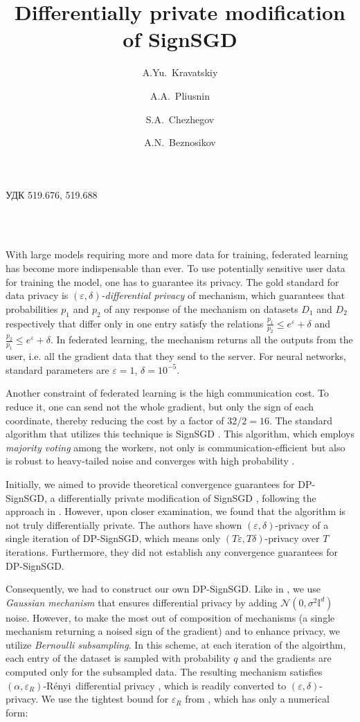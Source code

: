 \documentclass[a4paper, 12pt]{article}
\title{\textbf{Differentially private modification of SignSGD}}
\author[]{A.Yu.~Kravatskiy}
\author[]{A.A.~Pliusnin}
\author[]{S.A.~Chezhegov}
\author[]{A.N.~Beznosikov}
\affil[]{Moscow Institute of Physics and Technology}
\date{} %
\makeatletter
\renewcommand\maketitle{\par
  \begingroup
    \renewcommand\thefootnote{\@fnsymbol\c@footnote}%
    \def\@makefnmark{\rlap{\@textsuperscript{\normalfont\@thefnmark}}}%
    \long\def\@makefntext##1{\parindent 1em\noindent
            \hb@xt@1.8em{%
                \hss\@textsuperscript{\normalfont\@thefnmark}}##1}%
    \if@twocolumn
      \ifnum \col@number=\@ne
        \@maketitle
      \else
        \twocolumn[\@maketitle]%
      \fi
    \else
      \newpage
      \global\@topnum\z@
      \@maketitle
    \fi
    \thispagestyle{empty}\@thanks
  \endgroup
  \setcounter{footnote}{0}%
  \global\let\thanks\relax
  \global\let\maketitle\relax
  \global\let\@maketitle\relax
  \global\let\@thanks\@empty
  \global\let\@author\@empty
  \global\let\@date\@empty
  \global\let\@title\@empty
  \global\let\title\relax
  \global\let\author\relax
  \global\let\date\relax
  \global\let\and\relax
}
\renewcommand{\maketitle}{
  \begin{center}
    \fontsize{15}{12}\selectfont
    \textbf{\@title} \\
    \vspace{0.5em}
    \@author \\
    \vspace{0.5em}
    \@date
  \end{center}
  \vspace{-0.5em}
}
\renewcommand{\and}{\\} %
\newcommand{\eps}{\varepsilon}
\newcommand{\renyi}{R\'enyi}
\makeatother
\begin{document}
\noindent\foreignlanguage{russian}{УДК 519.676, 519.688}\vspace{-0.5em}
\maketitle
With large models requiring more and more data for training, federated learning has become more indispensable than ever. To use potentially sensitive user data for training the model, one has to guarantee its privacy. The gold standard for data privacy is \emph{$(\eps, \delta)$-differential privacy} \cite{Dwork2014} of mechanism, which guarantees that probabilities $p_1$ and $p_2$ of any response of the mechanism on datasets $D_1$ and $D_2$ respectively that differ only in one entry satisfy the relations $\frac{p_1}{p_2} \leq e^{\eps} + \delta$ and $\frac{p_2}{p_1} \leq e^{\eps} + \delta$. In federated learning, the mechanism returns all the outputs from the user, i.e. all the gradient data that they send to the server. For neural networks, standard parameters are $\eps = 1$, $\delta = 10^{-5}$. 

Another constraint of federated learning is the high communication cost. To reduce it, one can send not the whole gradient, but only the sign of each coordinate, thereby reducing the cost by a factor of $32/2 = 16$. The standard algorithm that utilizes this technique is SignSGD \cite{Bernstein2018}. This algorithm, which employs \emph{majority voting} among the workers, not only is communication-efficient but also is robust to heavy-tailed noise and converges with high probability \cite{Kornilov2025}.

Initially, we aimed to provide theoretical convergence guarantees for DP-SignSGD, a differentially private modification of SignSGD \cite{Jin2020}, following the approach in \cite{Kornilov2025}. However, upon closer examination, we found that the algorithm is not truly differentially private. The authors have shown $(\eps, \delta)$-privacy of a single iteration of DP-SignSGD, which means only $(T\eps, T\delta)$-privacy over $T$ iterations. Furthermore, they did not establish any convergence guarantees for DP-SignSGD.

Consequently, we had to construct our own DP-SignSGD. Like in \cite{Jin2020}, we use \emph{Gaussian mechanism} that ensures differential privacy by adding $\mathcal{N}(0,\sigma^2\mathbb{I}^d)$ noise. However, to make the most out of composition of mechanisms (a single mechanism returning a noised sign of the gradient) and to enhance privacy, we utilize \emph{Bernoulli subsampling}. In this scheme, at each iteration of the algoirthm, each entry of the dataset is sampled with probability $q$ and the gradients are computed only for the subsampled data. The resulting mechanism satisfies $(\alpha, \eps_R)$-\renyi\ differential privacy \cite{mironov2019SGM}, which is readily converted to $(\eps, \delta)$-privacy. We use the tightest bound for $\eps_R$ from \cite{mironov2019SGM}, which has only a numerical form:
\end{document}
